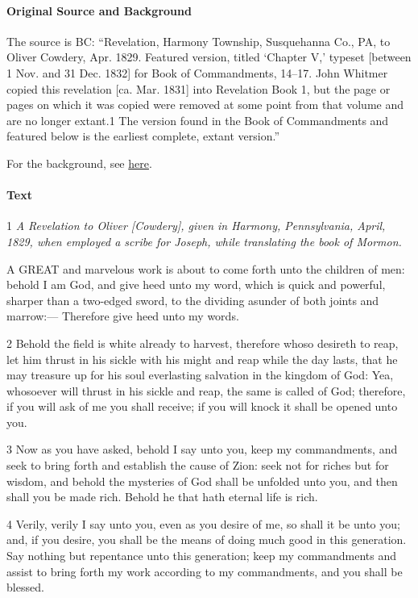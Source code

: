 			\paragraph{Original Source and Background}
			
				The source is BC: ``Revelation, Harmony Township, Susquehanna Co., PA, to Oliver Cowdery, Apr. 1829. Featured version, titled `Chapter V,' typeset [between 1 Nov. and 31 Dec. 1832] for Book of Commandments, 14--17. John Whitmer copied this revelation [ca. Mar. 1831] into Revelation Book 1, but the page or pages on which it was copied were removed at some point from that volume and are no longer extant.1 The version found in the Book of Commandments and featured below is the earliest complete, extant version.''
				
				For the background, see \hyperref[DC6-HB]{here}.
			
			\paragraph{Text}

				1 \textit{A Revelation to Oliver [Cowdery], given in Harmony, Pennsylvania, April, 1829, when employed a scribe for Joseph, while translating the book of Mormon.}

				A GREAT and marvelous work is about to come forth unto the children of men: behold I am God, and give heed unto my word, which is quick and powerful, sharper than a two-edged sword, to the dividing asunder of both joints and marrow:--- Therefore give heed unto my words.

				2 Behold the field is white already to harvest, therefore whoso desireth to reap, let him thrust in his sickle with his might and reap while the day lasts, that he may treasure up for his soul everlasting salvation in the kingdom of God: Yea, whosoever will thrust in his sickle and reap, the same is called of God; therefore, if you will ask of me you shall receive; if you will knock it shall be opened unto you.

				3 Now as you have asked, behold I say unto you, keep my commandments, and seek to bring forth and establish the cause of Zion: seek not for riches but for wisdom, and behold the mysteries of God shall be unfolded unto you, and then shall you be made rich. Behold he that hath eternal life is rich.

				4 Verily, verily I say unto you, even as you desire of me, so shall it be unto you; and, if you desire, you shall be the means of doing much good in this generation. Say nothing but repentance unto this generation; keep my commandments and assist to bring forth my work according to my commandments, and you shall be blessed.

